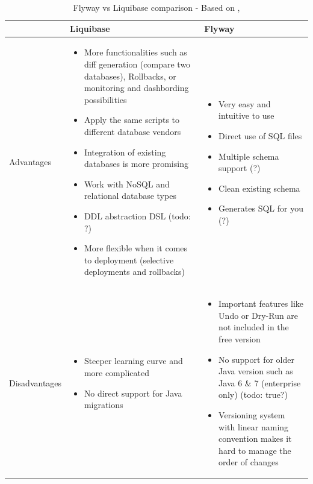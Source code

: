 \begin{table}[H]
	\centering
		    \begin{tabular}{|l|p{}|p{}|}
		    \toprule
			 & Liquibase & Flyway\\ \hline
			 \begin{turn}{-90}Advantages\end{turn} &
			\begin{itemize}
				\item More functionalities such as diff generation (compare two databases), Rollbacks, or monitoring and dashbording possibilities
				\item Apply the same scripts to different database vendors
				\item Integration of existing databases is more promising
				\item Work with NoSQL and relational database types
				\item DDL abstraction DSL (todo: ?)
				\item More flexible when it comes to deployment (selective deployments and rollbacks)
			\end{itemize} & \begin{itemize}
				\item Very easy and intuitive to use
				\item Direct use of SQL files
				\item Multiple schema support (?)
				\item Clean existing schema
				\item Generates SQL for you (?)
			\end{itemize}\\ \hline
		
	 \begin{turn}{-90}Disadvantages\end{turn} &
		\begin{itemize}
			\item Steeper learning curve and more complicated 
			\item No direct support for Java migrations
		\end{itemize} & \begin{itemize}
			\item Important features like Undo or Dry-Run are not included in the free version 
			\item No support for older Java version such as Java 6 \& 7 (enterprise only) (todo: true?)
			\item Versioning system with linear naming convention makes it hard to manage the order of changes
		\end{itemize}\\ \hline
		\end{tabular}
	\caption{Flyway vs Liquibase comparison - Based on \cite{Parsick2018}, \cite{Kaps2016}}
	\label{tab:flyway_liquivase_conparison}
\end{table}


